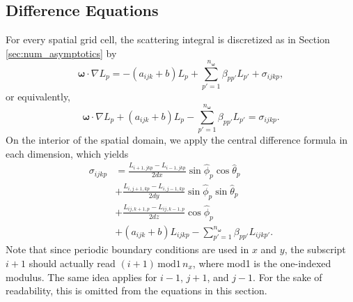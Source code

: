 \documentclass[ms,cpyr,lof,lot]{uathesis}
\renewcommand\vec\bm
\begin{document}
\subsection{Difference Equations}
\label{sec:difference_equations}

For every spatial grid cell, the scattering integral is discretized as in Section \ref{sec:num_asymptotics} by
\begin{equation*}
  \vec{\omega} \cdot \nabla L_p = -(a_{ijk}+b) L_p + \sum_{p'=1}^{n_{\vec{\omega}}} \beta_{pp'}L_{p'} + \sigma_{ijkp},
\end{equation*}
or equivalently,
\begin{equation*}
  \vec{\omega} \cdot \nabla L_p + (a_{ijk}+b)L_p - \sum_{p'=1}^{n_{\vec{\omega}}} \beta_{pp'} L_{p'} = \sigma_{ijkp}.
\end{equation*}
On the interior of the spatial domain, we apply the central difference formula in each dimension, which yields
\begin{equation*}
  \begin{aligned}
    \sigma_{ijkp} &= \frac{L_{i+1,jkp}-L_{i-1,jkp}}{2dx}\sin\hat{\phi}_p\cos\hat{\theta}_p \\
    &+ \frac{L_{i,j+1,kp}-L_{i,j-1,kp}}{2dy}\sin\hat{\phi}_p\sin\hat{\theta}_p \\
    &+ \frac{L_{ij,k+1,p}-L_{ij,k-1,p}}{2dz}\cos\hat{\phi}_p \\
    &+ (a_{ijk}+b)L_{ijkp}  - \sum_{p'=1}^{n_{\vec{\omega}}} \beta_{pp'} L_{ijkp'}.
  \end{aligned}
\end{equation*}
Note that since periodic boundary conditions are used in $x$ and $y$,
the subscript $i+1$ should actually read $(i+1) \, \mbox{mod1}\,  n_x$, where
mod1 is the one-indexed modulus.
The same idea applies for $i-1$, $j+1$, and $j-1$.
For the sake of readability, this is omitted from the equations in this section.
\end{document}
